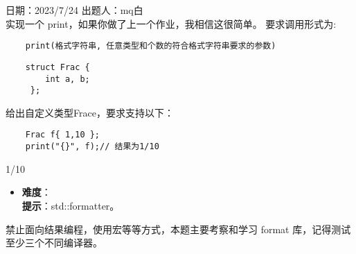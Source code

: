 日期：2023/7/24 出题人：mq白\\

实现一个 print，如果你做了上一个作业，我相信这很简单。 要求调用形式为:

\begin{verbatim}
    print(格式字符串, 任意类型和个数的符合格式字符串要求的参数)
\end{verbatim}

\begin{verbatim}
    struct Frac {
        int a, b;
     };
\end{verbatim}

给出自定义类型Frace，要求支持以下：

\begin{verbatim}
    Frac f{ 1,10 };
    print("{}", f);// 结果为1/10
\end{verbatim}

\begin{tcolorbox}[title = {要求运行结果},
        fonttitle = \bfseries, fontupper = \sffamily, fontlower = \itshape]
    1/10
\end{tcolorbox}

\begin{itemize}
    \item \textbf{难度}：  \\
          \textbf{提示}：std::formatter。
\end{itemize}

禁止面向结果编程，使用宏等等方式，本题主要考察和学习 format 库，记得测试至少三个不同编译器。
